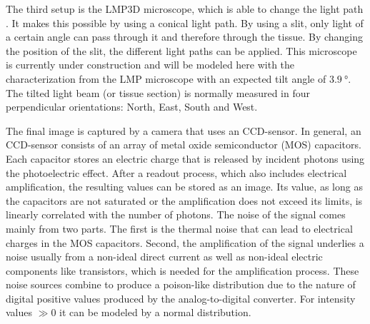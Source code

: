 \par
% 
The third setup is the \ac{LMP3D}  microscope, which is able to change the light path \cite{Wiese:887678}.
It makes this possible by using a conical light path.
By using a slit, only light of a certain angle can pass through it and therefore through the tissue.
By changing the position of the slit, the different light paths can be applied.
This microscope is currently under construction and will be modeled here with the characterization from the \ac{LMP} microscope with an expected tilt angle of $\SI{3.9}{\degree}$.
The tilted light beam (or tissue section) is normally measured in four perpendicular orientations: North, East, South and West.
\par
%
The final image is captured by a camera that uses an \ac{CCD}-sensor.
In general, an \ac{CCD}-sensor consists of an array of metal oxide semiconductor (MOS) capacitors.
Each capacitor stores an electric charge that is released by incident photons using the photoelectric effect.
After a readout process, which also includes electrical amplification, the resulting values can be stored as an image.
Its value, as long as the capacitors are not saturated or the amplification does not exceed its limits, is linearly correlated with the number of photons.
The noise of the signal comes mainly from two parts.
The first is the thermal noise that can lead to electrical charges in the MOS capacitors.
Second, the amplification of the signal underlies a noise usually from a non-ideal direct current as well as non-ideal electric components like transistors, which is needed for the amplification process.
These noise sources combine to produce a poison-like distribution due to the nature of digital positive values produced by the analog-to-digital converter.
For intensity values $\gg 0$ it can be modeled by a normal distribution.
%
%
%
